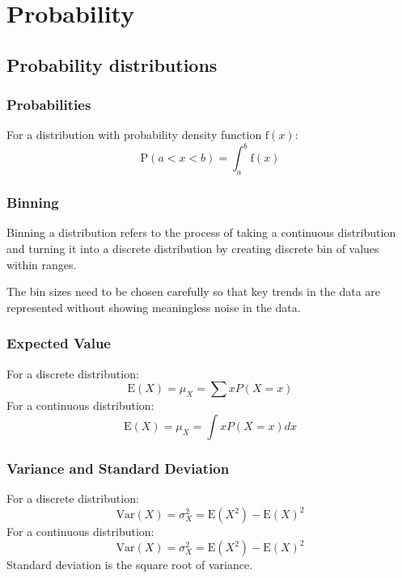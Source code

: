 \chapter{Probability}

\section{Probability distributions}
\subsection{Probabilities}
For a distribution with probability density function \(\mathrm{f}(x)\):
\begin{equation}
    \mathrm{P}(a < x < b) = \int_a^b \mathrm{f}(x)
\end{equation}

\subsection{Binning}
Binning a distribution refers to the process of taking a continuous distribution and turning it into a discrete distribution by creating discrete bin of values within ranges.

The bin sizes need to be chosen carefully so that key trends in the data are represented without showing meaningless noise in the data.

\subsection{Expected Value}
For a discrete distribution:
\begin{equation*}
    \mathrm{E}(X) = \mu_X = \sum x P(X = x)
\end{equation*}
For a continuous distribution:
\begin{equation*}
    \mathrm{E}(X) = \mu_X = \int x P(X = x) dx
\end{equation*}

\subsection{Variance and Standard Deviation}
For a discrete distribution:
\begin{equation}
    \mathrm{Var}(X) = \sigma_X^2 = \mathrm{E}(X^2) - \mathrm{E}(X)^2
\end{equation}
For a continuous distribution:
\begin{equation}
    \mathrm{Var}(X) = \sigma_X^2 = \mathrm{E}(X^2) - \mathrm{E}(X)^2
\end{equation}
Standard deviation is the square root of variance.

